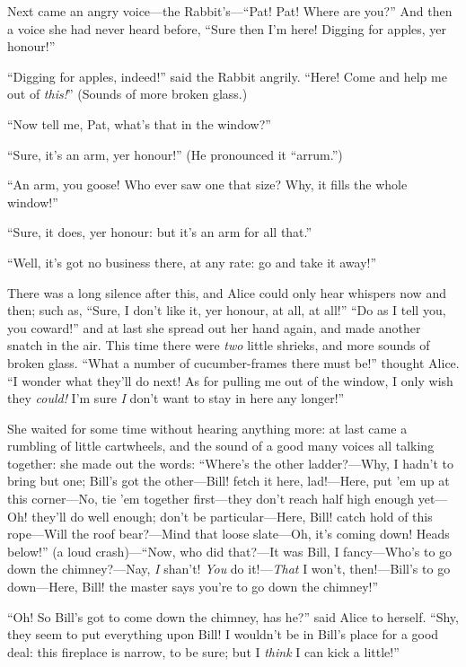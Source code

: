 \documentclass[book, 20pt]{extbook}
\begin{document}
Next came an angry voice---the Rabbit's---``Pat! Pat! Where are you?''
And then a voice she had never heard before, ``Sure then I'm here!
Digging for apples, yer honour!''

``Digging for apples, indeed!'' said the Rabbit angrily. ``Here! Come
and help me out of \emph{this!}'' (Sounds of more broken glass.)

``Now tell me, Pat, what's that in the window?''

``Sure, it's an arm, yer honour!'' (He pronounced it ``arrum.'')

``An arm, you goose! Who ever saw one that size? Why, it fills the whole
window!''

``Sure, it does, yer honour: but it's an arm for all that.''

``Well, it's got no business there, at any rate: go and take it away!''

There was a long silence after this, and Alice could only hear whispers
now and then; such as, ``Sure, I don't like it, yer honour, at all, at
all!'' ``Do as I tell you, you coward!'' and at last she spread out her
hand again, and made another snatch in the air. This time there were
\emph{two} little shrieks, and more sounds of broken glass. ``What a
number of cucumber-frames there must be!'' thought Alice. ``I wonder
what they'll do next! As for pulling me out of the window, I only wish
they \emph{could!} I'm sure \emph{I} don't want to stay in here any
longer!''

She waited for some time without hearing anything more: at last came a
rumbling of little cartwheels, and the sound of a good many voices all
talking together: she made out the words: ``Where's the other
ladder?---Why, I hadn't to bring but one; Bill's got the other---Bill!
fetch it here, lad!---Here, put 'em up at this corner---No, tie 'em
together first---they don't reach half high enough yet---Oh! they'll do
well enough; don't be particular---Here, Bill! catch hold of this
rope---Will the roof bear?---Mind that loose slate---Oh, it's coming
down! Heads below!'' (a loud crash)---``Now, who did that?---It was
Bill, I fancy---Who's to go down the chimney?---Nay, \emph{I} shan't!
\emph{You} do it!---\emph{That} I won't, then!---Bill's to go
down---Here, Bill! the master says you're to go down the chimney!''

``Oh! So Bill's got to come down the chimney, has he?'' said Alice to
herself. ``Shy, they seem to put everything upon Bill! I wouldn't be in
Bill's place for a good deal: this fireplace is narrow, to be sure; but
I \emph{think} I can kick a little!''
\end{document}
